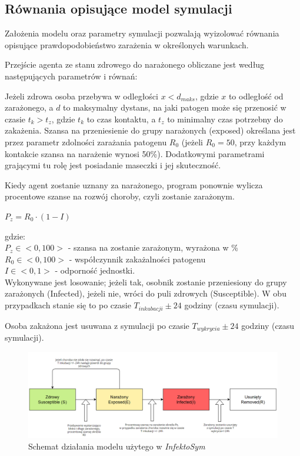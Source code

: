 \subsection{\textbf{Równania opisujące model symulacji}}
Założenia modelu oraz parametry symulacji pozwalają wyizolować równania opisujące prawdopodobieństwo zarażenia w określonych warunkach.

Przejście agenta ze stanu zdrowego do narażonego obliczane jest według następujących parametrów i równań:

Jeżeli zdrowa osoba przebywa w odległości $x < d_{maks}$, gdzie $x$ to odległość od zarażonego, a $d$ to maksymalny dystans, na jaki patogen może się przenosić w czasie $t_k > t_z$, gdzie $t_k$ to czas kontaktu, a $t_z$ to minimalny czas potrzebny do zakażenia. Szansa na przeniesienie do grupy narażonych (exposed) określana jest przez parametr zdolności zarażania patogenu $R_0$ (jeżeli $R_0 = 50$, przy każdym kontakcie szansa na narażenie wynosi 50\%).
Dodatkowymi parametrami grającymi tu rolę jest posiadanie maseczki i jej skuteczność. 

Kiedy agent zostanie uznany za narażonego, program ponownie wylicza procentowe szanse na rozwój choroby, czyli zostanie zarażonym.

\begin{center}
	$P_z = R_0 \cdot (1 - I)$
\end{center}

gdzie:\\
$P_z \in <0,100> $ - szansa na zostanie zarażonym, wyrażona w \% \\
$R_0 \in <0,100>$ - współczynnik zakażalności patogenu \\
$I \in <0,1>$ - odporność jednostki.\\

Wykonywane jest losowanie; jeżeli tak, osobnik zostanie przeniesiony do grupy zarażonych (Infected), jeżeli nie, wróci do puli zdrowych (Susceptible). W obu przypadkach stanie się to po czasie $T_{inkubacji} \pm 24$ godziny (czasu symulacji).

Osoba zakażona jest usuwana z symulacji po czasie $T_{wykrycia} \pm 24$ godziny (czasu symulacji).

\begin{figure}[h!]
	\includegraphics[width=\linewidth]{diagramModelu.png}
	\caption{Schemat działania modelu użytego w \textit{InfektoSym}}
\end{figure}

